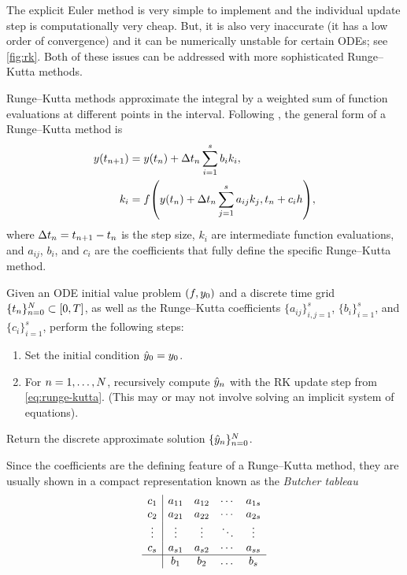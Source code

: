 \documentclass{mimosis}
\begin{document}
The explicit Euler method is very simple to implement and the individual update step is computationally very cheap.
But, it is also very inaccurate (it has a low order of convergence) and it can be numerically unstable for certain ODEs;
see \cref{fig:rk}.
Both of these issues can be addressed with more sophisticated Runge--Kutta methods.

Runge--Kutta methods approximate the integral by a weighted sum of function evaluations at different points in the interval.
Following
\textcite[Definition 7.1]{hairer2008solving},
the general form of a Runge--Kutta method is
\begin{subequations}
\label{eq:runge-kutta}
\begin{align}
  \val(t_{\idxt+1}) &= \val(t_\idxt) + \dt_\idxt \sum_{i=1}^s b_i k_i, \\
  k_i &= \vf( \val(t_\idxt) + \dt_\idxt \sum_{j=1}^s a_{ij} k_j, t_n + c_i h ),
\end{align}
\end{subequations}
where \({\Delta t}_{n} = t_{n+1} - t_n\) is the step size,
\(k_i\) are intermediate function evaluations,
and \(a_{ij}\), \(b_i\), and \(c_i\) are the coefficients that fully define the specific Runge--Kutta method.
\begin{alg}
Given an ODE initial value problem \((f, y_0)\) and a discrete time grid \(\{t_n\}_{n=0}^N \subset [0, T]\), as well as the Runge--Kutta coefficients \(\{a_{ij}\}_{i,j=1}^s\), \(\{b_i\}_{i=1}^s\), and \(\{c_i\}_{i=1}^s\), perform the following steps:
\begin{enumerate}[noitemsep]
\item Set the initial condition \(\hat{y}_0 = y_0\).
\item For \(n = 1, \ldots, N\), recursively compute
\(\hat{y}_n\) with the RK update step from \cref{eq:runge-kutta}.
(This may or may not involve solving an implicit system of equations).
\end{enumerate}
Return the discrete approximate solution \(\{ \hat{y}_n \}_{n=0}^N\).
\end{alg}


Since the coefficients are the defining feature of a Runge--Kutta method,
they are usually shown in a compact representation known as the \emph{Butcher tableau}
\cite{Butcher_1964,hairer2008solving}
\begin{equation}
  \begin{array}{c|cccc}
    c_1 & a_{11} & a_{12} & \cdots & a_{1s} \\
    c_2 & a_{21} & a_{22} & \cdots & a_{2s} \\
    \vdots & \vdots & \vdots & \ddots & \vdots \\
    c_s & a_{s1} & a_{s2} & \cdots & a_{ss} \\
    \hline
    & b_1 & b_2 & \dots & b_s
  \end{array}
\end{equation}
\end{document}
